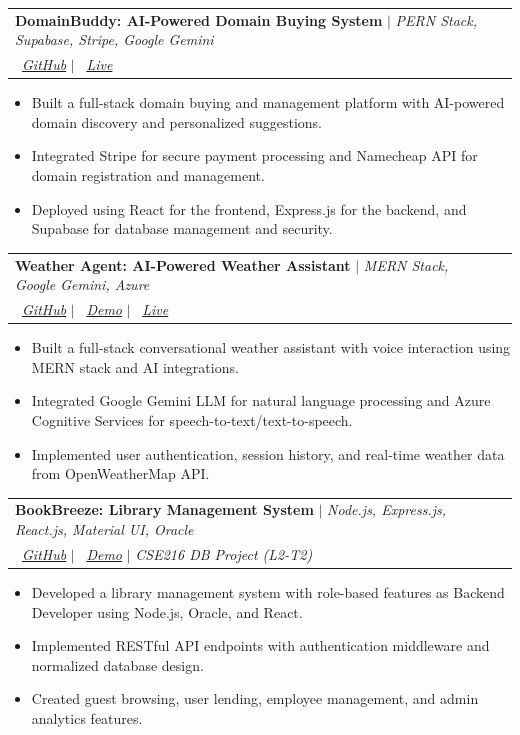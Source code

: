 \documentclass[letterpaper,11pt]{article}
\makeatletter
\newcommand{\resumeItem}[1]{
  \item\small{
    {#1 \vspace{-2pt}}
  }
}
\newcommand{\resumeProjectHeading}[2]{
    \vspace{-2pt}\item
    \begin{tabular*}{0.97\textwidth}{l@{\extracolsep{\fill}}r}
      \small#1 & #2 \\
    \end{tabular*}\vspace{-7pt}
}
\newcommand{\resumeItemListStart}{\begin{itemize}}
\newcommand{\resumeItemListEnd}{\end{itemize}\vspace{-5pt}}
\makeatother
\begin{document}
      \resumeProjectHeading
        {\textbf{DomainBuddy: AI-Powered Domain Buying System} $|$ \emph{PERN Stack, Supabase, Stripe, Google Gemini} \\ 
        \faGithub \, \emph{\href{https://github.com/AN-SWAPNIL/DomainBuddy}{\color{blue}GitHub}} $|$ \faGlobe \, \emph{\href{https://domainbuddy-client.onrender.com/}{\color{blue}Live}}} {}
          \resumeItemListStart
            \resumeItem{Built a full-stack domain buying and management platform with AI-powered domain discovery and personalized suggestions.}
            \resumeItem{Integrated Stripe for secure payment processing and Namecheap API for domain registration and management.}
            \resumeItem{Deployed using React for the frontend, Express.js for the backend, and Supabase for database management and security.}
          \resumeItemListEnd

      \resumeProjectHeading
        {\textbf{Weather Agent: AI-Powered Weather Assistant} $|$ \emph{MERN Stack, Google Gemini, Azure} \\ 
        \faGithub \, \emph{\href{https://github.com/AN-SWAPNIL/Weather_Agent}{\color{blue}GitHub}} $|$ \faYoutube \, \emph{\href{https://www.youtube.com/watch?v=lXfnw8ZzvdQ}{\color{blue}Demo}} $|$ \faGlobe \, \emph{\href{https://weather-agent-client.onrender.com/}{\color{blue}Live}}}{}
          \resumeItemListStart
            \resumeItem{Built a full-stack conversational weather assistant with voice interaction using MERN stack and AI integrations.}
            \resumeItem{Integrated Google Gemini LLM for natural language processing and Azure Cognitive Services for speech-to-text/text-to-speech.}
            \resumeItem{Implemented user authentication, session history, and real-time weather data from OpenWeatherMap API.}
          \resumeItemListEnd

      \resumeProjectHeading
        {\textbf{BookBreeze: Library Management System} $|$ \emph{Node.js, Express.js, React.js, Material UI, Oracle} \\ \faGithub \, \emph{\href{https://github.com/Jakaria44/Library-Management-System}{\color{blue}GitHub}} $|$ \faYoutube \, \emph{\href{https://www.youtube.com/watch?v=U3--wTRYMxs}{\color{blue}Demo}} $|$ \emph{CSE216 DB Project (L2-T2)}}{}
          \resumeItemListStart
            \resumeItem{Developed a library management system with role-based features as Backend Developer using Node.js, Oracle, and React.}
            \resumeItem{Implemented RESTful API endpoints with authentication middleware and normalized database design.}
            \resumeItem{Created guest browsing, user lending, employee management, and admin analytics features.}
          \resumeItemListEnd
      
\end{document}
